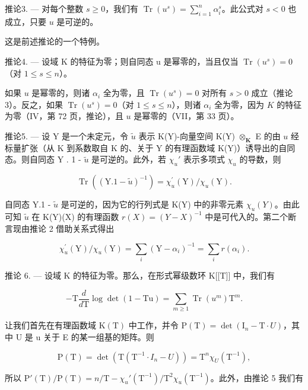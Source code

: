 推论3. --- 对每个整数 \(s \geqslant 0\)，我们有 \(\operatorname{Tr}(u^s) = \sum_{i=1}^{n} \alpha_i^s\)。此公式对 \(s < 0\) 也成立，只要 \(u\) 是可逆的。

这是前述推论的一个特例。

推论4. --- 设域 K 的特征为零；则自同态 u 是幂零的，当且仅当 \(\operatorname{Tr}(u^{s}) = 0\)（对 \(1 \leqslant s \leqslant n\)）。

如果 \(u\) 是幂零的，则诸 \(\alpha_{i}\) 全为零，且 \(\operatorname{Tr}(u^{s}) = 0\) 对所有 \(s > 0\) 成立（推论 3）。反之，如果 \(\operatorname{Tr}(u^{s}) = 0\)（对 \(1 \leqslant s \leqslant n\)），则诸 \(\alpha_{i}\) 全为零，因为 \(K\) 的特征为零（IV，第 72 页，推论），且 \(u\) 是幂零的（VII，第 33 页）。

推论5. --- 设 Y 是一个未定元，令 \(\tilde{u}\) 表示 K(Y)-向量空间 K(Y) \(\otimes_{\mathbf{K}}\) E 的由 \(u\) 经标量扩张（从 K 到系数取自 K 的、关于 Y 的有理函数域 K(Y)）诱导出的自同态。则自同态 Y . 1 - \(\tilde{u}\) 是可逆的。此外，若 \(\chi_u'\) 表示多项式 \(\chi_u\) 的导数，则

\[
\operatorname{Tr} \left(\left(\mathrm{Y}. 1 - \tilde {u}\right) ^ {- 1}\right) = \chi_ {u} ^ {\prime} (\mathrm{Y}) / \chi_ {u} (\mathrm{Y}).
\]

自同态 Y.1 - \(\tilde{u}\) 是可逆的，因为它的行列式是 K(Y) 中的非零元素 \(\chi_u(Y)\)。由此可知 \(\tilde{u}\) 在 K(Y)(X) 的有理函数 \(r(X) = (Y - X)^{-1}\) 中是可代入的。第二个断言现由推论 2 借助关系式得出

\[
\chi_ {u} ^ {\prime} (\mathrm{Y}) / \chi_ {u} (\mathrm{Y}) = \sum_ {i} \left(\mathrm{Y} - \alpha_ {i}\right) ^ {- 1} = \sum_ {i} r \left(\alpha_ {i}\right).
\]

推论 6. --- 设域 K 的特征为零。那么，在形式幂级数环 K{[}{[}T{]}{]} 中，我们有

\[
- \mathrm{T} \frac {d}{d \mathrm{T}} \log \det (1 - \mathrm{Tu}) = \sum_ {m \geqslant 1} \operatorname{Tr} \left(u ^ {m}\right) \mathrm{T} ^ {m}.
\]

让我们首先在有理函数域 \(\mathrm{K}(\mathrm{T})\) 中工作，并令 \(\mathrm{P}(\mathrm{T}) = \det(\mathrm{I}_{n} - \mathrm{T} \cdot U)\)，其中 U 是 u 关于 E 的某一组基的矩阵。则

\[
\mathrm{P} (\mathrm{T}) = \det \left(\mathrm{T} \left(\mathrm{T} ^ {- 1} \cdot I _ {n} - U\right)\right) = \mathrm{T} ^ {n} \chi_ {U} \left(\mathrm{T} ^ {- 1}\right),
\]

所以 \(\mathrm{P}'(\mathrm{T}) / \mathrm{P}(\mathrm{T}) = n / \mathrm{T} - \chi_u'(\mathrm{T}^{-1}) / \mathrm{T}^2\chi_u(\mathrm{T}^{-1})\)。此外，由推论 5 我们有

